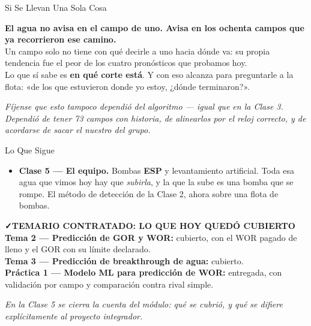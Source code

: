 \documentclass[aspectratio=169, 11pt]{beamer}
\begin{document}
\begin{frame}[shrink=8]{Si Se Llevan Una Sola Cosa}
  \vspace{6pt}
  \begin{tcolorbox}[colback=arcaGray, colframe=arcaRed, boxrule=0pt, leftrule=4pt,
    arc=3pt, left=10pt, right=10pt, top=9pt, bottom=9pt]
    {\large\color{arcaDark}\bfseries
     El agua no avisa en el campo de uno. Avisa en los ochenta campos que ya
     recorrieron ese camino.}\\[7pt]
    {\footnotesize\color{textMuted}
     Un campo solo no tiene con qué decirle a uno hacia dónde va: su propia
     tendencia fue el peor de los cuatro pronósticos que probamos hoy.\\[6pt]
     Lo que sí sabe es \textbf{en qué corte está}. Y con eso alcanza para
     preguntarle a la flota: «de los que estuvieron donde yo estoy, ¿dónde
     terminaron?».}
  \end{tcolorbox}
  \vspace{9pt}
  {\footnotesize\color{arcaDark}\itshape
   Fíjense que esto tampoco dependió del algoritmo --- igual que en la Clase 3.
   Dependió de tener 73 campos con historia, de alinearlos por el reloj
   correcto, y de acordarse de sacar el nuestro del grupo.}
\end{frame}

\begin{frame}[shrink=8]{Lo Que Sigue}
  \vspace{4pt}
  {\footnotesize\color{textMuted}
  \begin{itemize}\setlength{\itemsep}{9pt}
    \item[{\color{arcaRed}\faArrowCircleRight}]
      \textbf{Clase 5 --- El equipo.} Bombas \textbf{ESP} y levantamiento
      artificial. Toda esa agua que vimos hoy hay que \emph{subirla}, y la que
      la sube es una bomba que se rompe. El método de detección de la Clase 2,
      ahora sobre una flota de bombas.
  \end{itemize}}
  \vspace{8pt}
  \begin{tcolorbox}[colback=arcaGray, colframe=codeGreen, boxrule=0pt, leftrule=3pt,
    arc=3pt, left=8pt, right=8pt, top=5pt, bottom=5pt]
    {\scriptsize\color{codeGreen}\bfseries\faCheck\hspace{4pt}TEMARIO CONTRATADO: LO QUE HOY QUEDÓ CUBIERTO}\\[4pt]
    {\scriptsize\color{textMuted}
     \textbf{Tema 2 --- Predicción de GOR y WOR:} cubierto, con el WOR pagado
     de lleno y el GOR con su límite declarado.\\
     \textbf{Tema 3 --- Predicción de breakthrough de agua:} cubierto.\\
     \textbf{Práctica 1 --- Modelo ML para predicción de WOR:} entregada, con
     validación por campo y comparación contra rival simple.}
  \end{tcolorbox}
  \vspace{6pt}
  {\scriptsize\color{arcaDark}\itshape
   En la Clase 5 se cierra la cuenta del módulo: qué se cubrió, y qué se
   difiere explícitamente al proyecto integrador.}
\end{frame}
\end{document}
